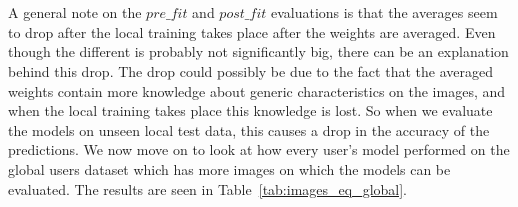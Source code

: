 \documentclass[12pt]{article}
\begin{document}
\\\\
A general note on the $pre\_fit$ and $post\_fit$ evaluations is that the averages seem to drop after the local training takes place after the weights are averaged. Even though the different is probably not significantly big, there can be an explanation behind this drop. The drop could possibly be due to the fact that the averaged weights contain more knowledge about generic characteristics on the images, and when the local training  takes place this knowledge is lost. So when we evaluate the models on unseen local test data, this causes a drop in the accuracy of the predictions. We now move on to look at how every user's model performed on the global users dataset which has more images on which the models can be evaluated. The results are seen in Table~\ref{tab:images_eq_global}.
\begin{table}[H]
\def\arraystretch{1.2}%

\caption{Image dataset: Results from testing user models on global user's data with $P = \frac{1}{8}$} \label{tab:images_eq_global}
\end{table}
\end{document}
